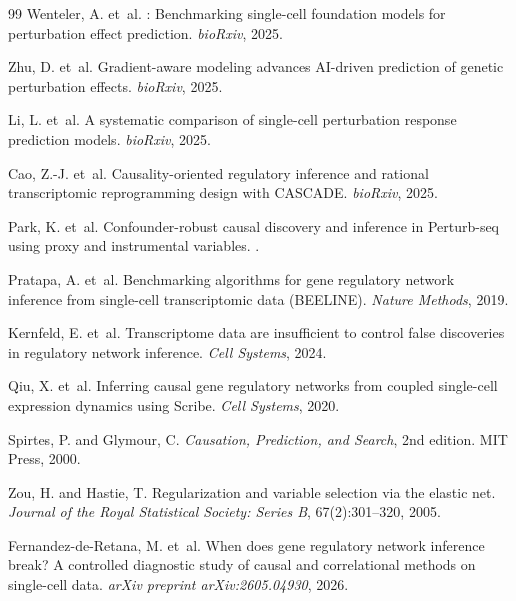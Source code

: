 \documentclass{article}
\theoremstyle{plain}
\theoremstyle{definition}
\theoremstyle{remark}
\begin{document}
\begin{thebibliography}{99}
Wenteler, A. et~al.
: Benchmarking single-cell foundation models for perturbation effect prediction.
\newblock \emph{bioRxiv}, 2025.

Zhu, D. et~al.
\newblock Gradient-aware modeling advances {AI}-driven prediction of genetic perturbation effects.
\newblock \emph{bioRxiv}, 2025.

Li, L. et~al.
\newblock A systematic comparison of single-cell perturbation response prediction models.
\newblock \emph{bioRxiv}, 2025.

Cao, Z.-J. et~al.
\newblock Causality-oriented regulatory inference and rational transcriptomic reprogramming design with {CASCADE}.
\newblock \emph{bioRxiv}, 2025.

Park, K. et~al.
\newblock Confounder-robust causal discovery and inference in {Perturb-seq} using proxy and instrumental variables.
.

Pratapa, A. et~al.
\newblock Benchmarking algorithms for gene regulatory network inference from single-cell transcriptomic data ({BEELINE}).
\newblock \emph{Nature Methods}, 2019.

Kernfeld, E. et~al.
\newblock Transcriptome data are insufficient to control false discoveries in regulatory network inference.
\newblock \emph{Cell Systems}, 2024.

Qiu, X. et~al.
\newblock Inferring causal gene regulatory networks from coupled single-cell expression dynamics using {Scribe}.
\newblock \emph{Cell Systems}, 2020.

Spirtes, P. and Glymour, C.
\newblock \emph{Causation, Prediction, and Search}, 2nd edition.
\newblock MIT Press, 2000.

Zou, H. and Hastie, T.
\newblock Regularization and variable selection via the elastic net.
\newblock \emph{Journal of the Royal Statistical Society: Series B}, 67(2):301--320, 2005.

Fernandez-de-Retana, M. et~al.
\newblock When does gene regulatory network inference break? {A} controlled diagnostic study of causal and correlational methods on single-cell data.
\newblock \emph{arXiv preprint arXiv:2605.04930}, 2026.


\end{thebibliography}
\end{document}
